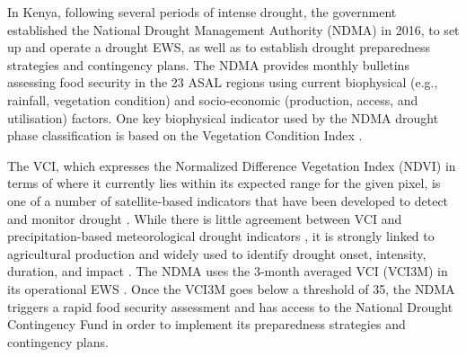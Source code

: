 \documentclass[review]{elsarticle}
\begin{document}
In Kenya, following several periods of intense drought, the government established the National Drought Management Authority (NDMA) in 2016, to set up and operate a drought EWS, as well as to establish drought preparedness strategies and contingency plans. The NDMA provides monthly bulletins assessing food security in the 23 ASAL regions using current  biophysical (e.g., rainfall, vegetation condition) and socio-economic (production, access, and utilisation) factors. One key biophysical indicator used by the NDMA drought phase classification is based on the Vegetation Condition Index  \citep[VCI,][]{KOGAN199591,rs8040267,RULINDA201132,ROJAS2011343}. 

The VCI, which expresses the Normalized Difference Vegetation Index (NDVI) in terms of where it currently lies within its expected range for the given pixel, is one of a number of satellite-based indicators that have been developed to detect and monitor drought \citep{zargar2011review}. While there is little agreement between VCI and precipitation-based meteorological drought indicators \citep{quiring2010evaluating,BHUIYAN2006289}, it is strongly linked to agricultural production and widely used to identify drought onset, intensity, duration, and impact \citep{rs8030224}. The NDMA uses the 3-month averaged VCI (VCI3M) in its operational EWS \citep{rs8040267}. Once the VCI3M goes below a threshold of 35, the NDMA triggers a rapid food security assessment and has access to the National Drought Contingency Fund in order to implement its preparedness strategies and contingency plans.


\end{document}
